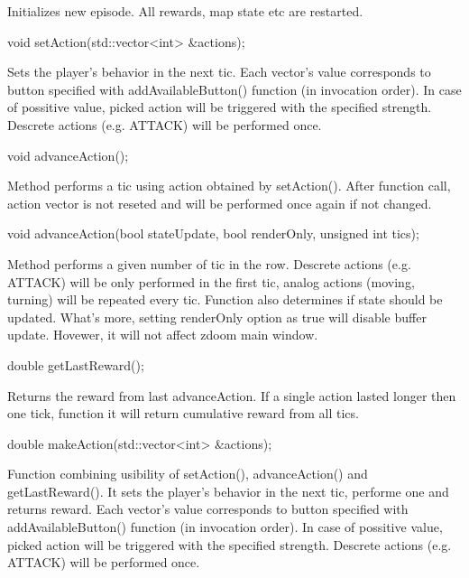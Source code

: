 Initializes new episode. All rewards, map state etc are restarted.


\vspace{20pt}
\begin{clinee}
	void setAction(std::vector<int> &actions);
\end{clinee}

Sets the player's behavior in the next tic.
Each vector's value corresponds to button specified with addAvailableButton() function (in invocation order).
In case of possitive value, picked action will be triggered with the specified strength. Descrete actions (e.g. ATTACK) will be performed once.


\vspace{20pt}
\begin{clinee}
	void advanceAction();
\end{clinee}

Method performs a tic using action obtained by setAction(). After function call, action vector is not reseted and will be performed once again if not changed.


\vspace{20pt}
\begin{clinee}
	void advanceAction(bool stateUpdate, bool renderOnly, unsigned int tics);
\end{clinee}

Method performs a given number of tic in the row. Descrete actions (e.g. ATTACK) will be only performed in the first tic, analog actions (moving, turning) will be repeated every tic. 
Function also determines if state should be updated. What's more, setting renderOnly option as true will disable buffer update. Hovewer, it will not affect zdoom main window.  


\vspace{20pt}
\begin{clinee}
	double getLastReward();
\end{clinee}

Returns the reward from last advanceAction. If a single action lasted longer then one tick, function it will return cumulative reward from all tics.


\vspace{20pt}
\begin{clinee}
	double makeAction(std::vector<int> &actions);
\end{clinee}

Function combining usibility of setAction(), advanceAction() and getLastReward(). It sets the player's behavior in the next tic, performe one and returns reward.
Each vector's value corresponds to button specified with addAvailableButton() function (in invocation order).
In case of possitive value, picked action will be triggered with the specified strength. Descrete actions (e.g. ATTACK) will be performed once. 



